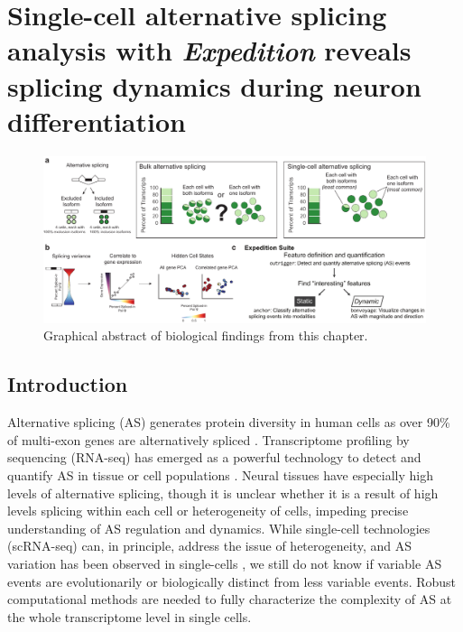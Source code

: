 \chapter{Single-cell alternative splicing analysis with \emph{Expedition} reveals splicing dynamics during neuron differentiation}


\begin{figure}[h]
  \centering
  \includegraphics[width=5.8in]{figures/graphical_abstract.pdf}
  \caption{Graphical abstract of biological findings from this chapter.}
  \label{fig:graphical_abstract}
\end{figure}

\section{Introduction}
Alternative splicing (AS) generates protein diversity in human cells as over 90\% of multi-exon genes are alternatively spliced \cite{Wang2008-xh,Johnson:2003kha,Pan:2008jq,Takeda:2009gl}. Transcriptome profiling by sequencing (RNA-seq) has emerged as a powerful technology to detect and quantify AS in tissue or cell populations \cite{Merkin:2012hv,BarbosaMorais:2012crb,Wang2008-xh}. Neural tissues have especially high levels of alternative splicing, though it is unclear whether it is a result of high levels splicing within each cell or heterogeneity of cells, impeding precise understanding of AS regulation and dynamics. While single-cell technologies (scRNA-seq) can, in principle, address the issue of heterogeneity, and AS variation has been observed in single-cells \cite{Marinov2014-iw,Shalek2013-ez,Welch2016-it}, we still do not know if variable AS events are evolutionarily or biologically distinct from less variable events. Robust computational methods are needed to fully characterize the complexity of AS at the whole transcriptome level in single cells.

